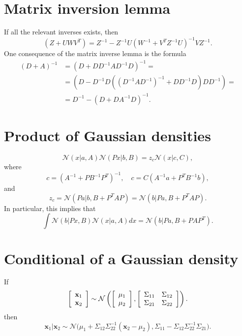 \section{Matrix inversion lemma}
If all the relevant inverses exists, then
\begin{equation}\label{matrixinversionlemma}
 (Z + UWV^T) = Z^{-1} - Z^{-1}U(W^{-1} + V^T Z^{-1} U)^{-1} V Z^{-1}.
\end{equation}
One consequence of the matrix inverse lemma is the formula
\begin{equation}\label{matrixinverselemmalemma}
\begin{split}
 (D + A)^{-1} & = (D + D D^{-1} A D^{-1} D)^{-1} = \\
			  & = (D - D^{-1} D ((D^{-1} A D^{-1})^{-1} + D D^{-1} D) D D^{-1})  = \\
			  & = D^{-1} - (D + D A^{-1} D)^{-1}.
\end{split}
\end{equation}
\section{Product of Gaussian densities}
\begin{equation}\label{productgaussians}
 \mathcal{N}(x|a,A) \mathcal{N}(Px|b,B) = z_c \mathcal{N}(x|c,C),
\end{equation}
where
\begin{displaymath}
 c = (A^{-1} + P B^{-1} P^T)^{-1}, \quad c = C(A^{-1}a + P^T B^{-1} b),
\end{displaymath}
and
\begin{displaymath}
 z_c = \mathcal{N}(Pa|b,B+P^T A P) = \mathcal{N}(b|Pa,B+P^T A P).
\end{displaymath}
In particular, this implies that
\begin{equation}\label{margingaussian}
 \int \mathcal{N}(b|Px,B) \mathcal{N}(x|a,A) dx = \mathcal{N}(b|Pa,B+P A P^T).
\end{equation}
\section{Conditional of a Gaussian density}\label{appendixconditional}
If
\begin{equation}
\left[ \begin{array}{c} 
\mathbf{x}_1 \\
\mathbf{x}_2 \end{array} \right] \sim \mathcal{N} 
\left( \left[ \begin{array}{c}
\mu_1 \\
\mu_2 \end{array} \right] , 
\left[ \begin{array}{c c} 
\Sigma_{11} & \Sigma_{12} \\
\Sigma_{21} & \Sigma_{22} \end{array} \right]
\right).
\end{equation}
then 
\begin{equation}
\mathbf{x}_1|\mathbf{x}_2 \sim \mathcal{N}\big(\mu_1 + \Sigma_{12} \Sigma_{22}^{-1}(\mathbf{x}_2 - \mu_2),\Sigma_{11} - \Sigma_{12}\Sigma_{22}^{-1} \Sigma_{21}\big).
\end{equation}
\clearpage

